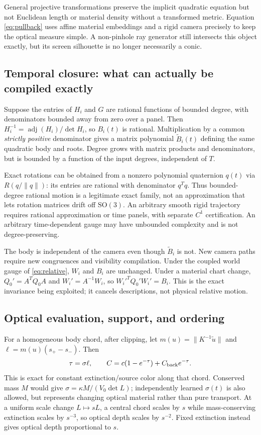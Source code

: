 \documentclass[10pt,letterpaper]{article}
\theoremstyle{remark}\newtheorem{counterexample}[proposition]{Counterexample}
\newcommand{\adj}{\operatorname{adj}}
\newcommand{\SO}{\mathrm{SO}}
\begin{document}
General projective transformations preserve the implicit quadratic equation but not Euclidean length or material density without a transformed metric. Equation \eqref{eq:pullback} uses affine material embeddings and a rigid camera precisely to keep the optical measure simple. A non-pinhole ray generator still intersects this object exactly, but its screen silhouette is no longer necessarily a conic.

\subsection{Temporal closure: what can actually be compiled exactly}
Suppose the entries of $H_i$ and $G$ are rational functions of bounded degree, with denominators bounded away from zero over a panel. Then $H_i^{-1}=\adj(H_i)/\det H_i$, so $B_i(t)$ is rational. Multiplication by a common \emph{strictly positive} denominator gives a matrix polynomial $\widetilde B_i(t)$ defining the same quadratic body and roots. Degree grows with matrix products and denominators, but is bounded by a function of the input degrees, independent of $T$.

Exact rotations can be obtained from a nonzero polynomial quaternion $q(t)$ via $R(q/\|q\|)$: its entries are rational with denominator $q^Tq$. Thus bounded-degree rational motion is a legitimate exact family, not an approximation that lets rotation matrices drift off $\SO(3)$. An arbitrary smooth rigid trajectory requires rational approximation or time panels, with separate $C^1$ certification. An arbitrary time-dependent gauge may have unbounded complexity and is not degree-preserving.

The body is independent of the camera even though $\widetilde B_i$ is not. New camera paths require new congruences and visibility compilation. Under the coupled world gauge of \eqref{eq:relative}, $W_i$ and $B_i$ are unchanged. Under a material chart change, $Q_0'=A^TQ_0A$ and $W_i'=A^{-1}W_i$, so $W_i'^TQ_0'W_i'=B_i$. This is the exact invariance being exploited; it cancels descriptions, not physical relative motion.

\subsection{Optical evaluation, support, and ordering}
For a homogeneous body chord, after clipping, let $m(u)=\|K^{-1}\widetilde u\|$ and $\ell=m(u)(s_+-s_-)$. Then
\begin{equation}
 \tau=\sigma\ell,\qquad C=c(1-e^{-\tau})+C_{\rm back}e^{-\tau}. \label{eq:chord}
\end{equation}
This is exact for constant extinction/source color along that chord. Conserved mass $M$ would give $\sigma=\kappa M/(V_0\det L)$; independently learned $\sigma(t)$ is also allowed, but represents changing optical material rather than pure transport. At a uniform scale change $L\mapsto sL$, a central chord scales by $s$ while mass-conserving extinction scales by $s^{-3}$, so optical depth scales by $s^{-2}$. Fixed extinction instead gives optical depth proportional to $s$.
\end{document}
